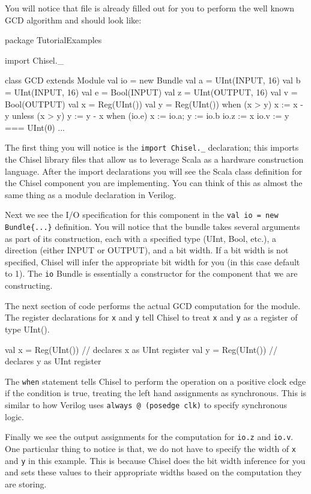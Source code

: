 You will notice that file is already filled out for you to perform the well known GCD algorithm and should look like:

\begin{scala}
package TutorialExamples

import Chisel._

class GCD extends Module {
  val io = new Bundle {
    val a  = UInt(INPUT,  16)
    val b  = UInt(INPUT,  16)
    val e  = Bool(INPUT)
    val z  = UInt(OUTPUT, 16)
    val v  = Bool(OUTPUT)
  }
  val x  = Reg(UInt())
  val y  = Reg(UInt())
  when   (x > y) { x := x - y } 
  unless (x > y) { y := y - x }
  when (io.e) { x := io.a; y := io.b }
  io.z := x
  io.v := y === UInt(0)
} ...
\end{scala}

The first thing you will notice is the \verb+import Chisel._+ declaration; this imports the Chisel library files that allow us to leverage Scala as a hardware construction language. After the import declarations you will see the Scala class definition for the Chisel component you are implementing. You can think of this as almost the same thing as a module declaration in Verilog.

Next we see the I/O specification for this component in the \verb+val io = new Bundle{...}+ definition. You will notice that the bundle takes several arguments as part of its construction, each with a specified type (UInt, Bool, etc.), a direction (either INPUT or OUTPUT), and a bit width. If a bit width is not specified, Chisel will infer the appropriate bit width for you (in this case default to 1). The \verb+io+ Bundle is essentially a constructor for the component that we are constructing.

The next section of code performs the actual GCD computation for the module. The register declarations for \verb+x+ and \verb+y+ tell Chisel to treat \verb+x+ and \verb+y+ as a register of type UInt(). 

\begin{scala}
val x = Reg(UInt()) // declares x as UInt register
val y = Reg(UInt()) // declares y as UInt register
\end{scala}

The \verb+when+ statement tells Chisel to perform the operation on a positive clock edge if the condition is true, treating the left hand assignments as synchronous. This is similar to how Verilog uses \verb+always @ (posedge clk)+ to specify synchronous logic.

Finally we see the output assignments for the computation for \verb+io.z+ and \verb+io.v+. One particular thing to notice is that, we do not have to specify the width of \verb+x+ and \verb+y+ in this example. This is because Chisel does the bit width inference for you and sets these values to their appropriate widths based on the computation they are storing.

